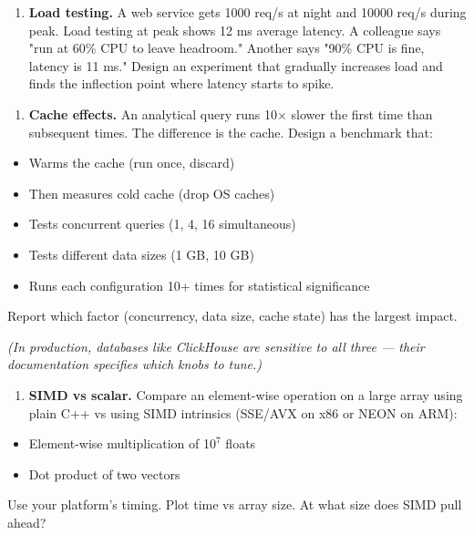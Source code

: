 \begin{enumerate}
\item \textbf{Load testing.} A web service gets 1000 req/s at night and 10000 req/s during peak. Load testing at peak shows 12 ms average latency. A colleague says "run at 60\% CPU to leave headroom." Another says "90\% CPU is fine, latency is 11 ms." Design an experiment that gradually increases load and finds the inflection point where latency starts to spike.
\end{enumerate}

\begin{enumerate}
\item \textbf{Cache effects.} An analytical query runs 10$\times $ slower the first time than subsequent times. The difference is the cache. Design a benchmark that:
\end{enumerate}
\begin{itemize}
\item Warms the cache (run once, discard)
\item Then measures cold cache (drop OS caches)
\item Tests concurrent queries (1, 4, 16 simultaneous)
\item Tests different data sizes (1 GB, 10 GB)
\item Runs each configuration 10+ times for statistical significance
\end{itemize}
   Report which factor (concurrency, data size, cache state) has the largest impact.

   \textit{(In production, databases like ClickHouse are sensitive to all three — their documentation specifies which knobs to tune.)}

\begin{enumerate}
\item \textbf{SIMD vs scalar.} Compare an element-wise operation on a large array using plain C++ vs using SIMD intrinsics (SSE/AVX on x86 or NEON on ARM):
\end{enumerate}
\begin{itemize}
\item Element-wise multiplication of 1$0^{7}$ floats
\item Dot product of two vectors
\end{itemize}
   Use your platform's timing. Plot time vs array size. At what size does SIMD pull ahead?

